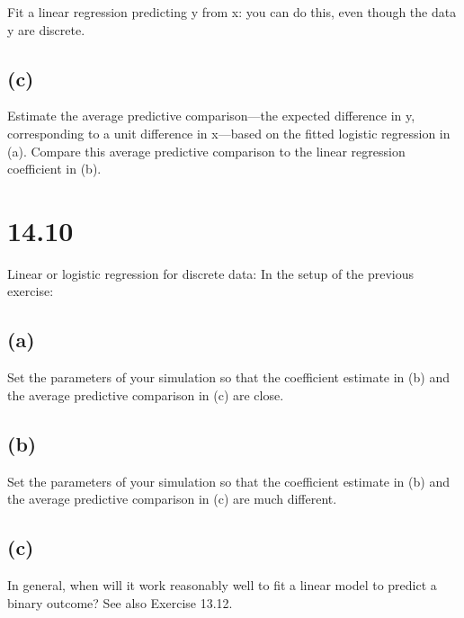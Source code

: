 \documentclass[
]{article}
\begin{document}
Fit a linear regression predicting y from x: you can do this, even
though the data y are discrete.

\hypertarget{c-3}{%
\subsection{(c)}\label{c-3}}

Estimate the average predictive comparison---the expected difference in
y, corresponding to a unit difference in x---based on the fitted
logistic regression in (a). Compare this average predictive comparison
to the linear regression coefficient in (b).

\hypertarget{section-7}{%
\section{14.10}\label{section-7}}

Linear or logistic regression for discrete data: In the setup of the
previous exercise:

\hypertarget{a-8}{%
\subsection{(a)}\label{a-8}}

Set the parameters of your simulation so that the coefficient estimate
in (b) and the average predictive comparison in (c) are close.

\hypertarget{b-8}{%
\subsection{(b)}\label{b-8}}

Set the parameters of your simulation so that the coefficient estimate
in (b) and the average predictive comparison in (c) are much different.

\hypertarget{c-4}{%
\subsection{(c)}\label{c-4}}

In general, when will it work reasonably well to fit a linear model to
predict a binary outcome? See also Exercise 13.12.
\end{document}
